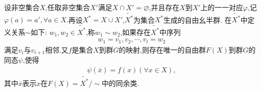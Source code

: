 \documentclass[../../main.tex]{subfiles}%
\begin{document}
\begin{theorem}\label{theorem:抽象代数--定理4.8.3}
设非空集合$X$,任取非空集合$X'$满足$X\cap X'=\varnothing$,并且存在$X$到$X'$上的一一对应$\varphi$,记$\varphi(a)=a',\forall a\in X.$再设$X^*=X\cup X'$,$\widetilde{X^*}$为集合$X^*$生成的自由幺半群. 在$\widetilde{X^*}$中定义关系$\sim$如下: $w_1,w_2\in \widetilde{X^*}$,称$w_1\sim w_2$,如果存在$\widetilde{X^*}$中序列
\begin{align*}
w_1 = v_1, v_2, \cdots, v_l = w_2
\end{align*}
满足$v_i$与$v_{i+1}$相邻.又$f$是集合$X$到群$G$的映射,则存在唯一的自由群$F(X)$到群$G$的同态$\psi$,使得
\begin{align*}
\psi(\overline{x})=f(x)(\forall x\in X),
\end{align*}
其中$\overline{x}$表示$x$在$F(X)=\widetilde{X^*}/\sim$中的同余类.
\end{theorem}
\end{document}

